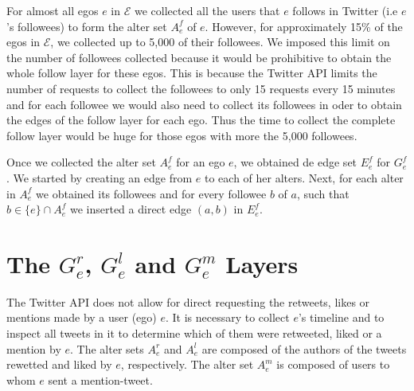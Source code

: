 For almost all egos $e$ in  $\mathcal{E}$ we collected all the users that $e$ follows in Twitter (i.e $e$'s followees) to form the alter set $A_e^f$ of $e$.  However, for approximately 15\% of the egos in $\mathcal{E}$, we collected up to 5,000 of their followees. We imposed this limit on the number of followees collected because it would be prohibitive to obtain the whole follow layer for these egos. This is  because the Twitter API limits the number of requests to collect the followees to only 15 requests every 15 minutes and for each followee we would also need to collect its followees in oder to obtain the edges of the follow layer for each ego. Thus the time to collect the complete follow layer would be huge for those egos with more the 5,000 followees.

Once we collected the alter set $A_e^f$ for an ego $e$, we obtained de edge set $E_e^f$ for $G_e^f$. We started by  creating an edge from $e$ to each of her alters. Next, for each alter in $A_e^f$ we obtained its followees and for every followee $b$ of $a$, such that $b \in  \{e\} \cap A_e^f$ we inserted  a direct edge $(a,b)$ in $E_e^f$. 
 






\section{The \texorpdfstring{$G_e^r$}{Ger}, \texorpdfstring{$G_e^l$}{Gel} and \texorpdfstring{$G_e^m$}{Gem} Layers}
\label{sec:dataset_retweets_network}
The Twitter API does not allow for direct requesting the retweets, likes or mentions made by  a user (ego) $e$. It is necessary to collect $e$'s timeline and to inspect all tweets in it to determine which of them were retweeted, liked  or a mention by  $e$. The alter sets $A_e^r$ and $A_e^l$ are composed of the authors of the tweets rewetted and liked by $e$, respectively. The alter set $A_e^m$ is composed of users to whom $e$ sent a mention-tweet.

